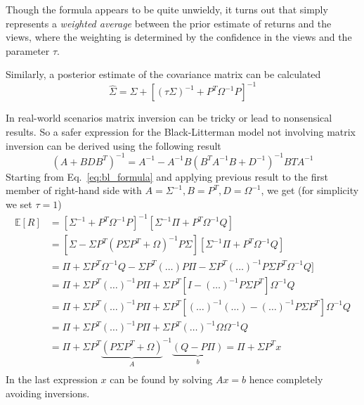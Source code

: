 Though the formula appears to be quite unwieldy, it turns out that simply represents a \emph{weighted average} between the prior estimate of returns and the views, where the weighting is determined by the confidence in the views and the parameter $\tau$.

Similarly, a posterior estimate of the covariance matrix can be calculated
\begin{equation}
\hat{\Sigma} = \Sigma +[(\tau \Sigma)^{-1} + P^T \Omega^{-1}P]^{-1}
\end{equation}

\begin{attention}
In real-world scenarios matrix inversion can be tricky or lead to nonsensical results. So a safer expression for the Black-Litterman model not involving matrix inversion can be derived using the following result
\begin{equation*}
(A+BDB^T)^{-1} = A^{-1} - A^{-1}B(B^TA^{-1}B+D^{-1})^{-1}BTA^{-1}
\end{equation*}
Starting from Eq.~\ref{eq:bl_formula} and applying previous result to the first member of right-hand side with $A=\Sigma^{-1}, B=P^T, D=\Omega^{-1}$,
we get (for simplicity we set $\tau=1$)
\begin{equation}
\begin{aligned}
\mathbb{E}[R] &= [\Sigma^{-1}+P^T\Omega^{-1}P]^{-1}[\Sigma^{-1}\Pi + P^T\Omega^{-1}Q] \\
 &= [\Sigma - \Sigma P^T(P\Sigma P^T + \Omega)^{-1} P\Sigma][\Sigma^{-1}\Pi + P^T\Omega^{-1}Q] \\
 &= \Pi + \Sigma P^T\Omega^{-1}Q - \Sigma P^T(\ldots)P\Pi - \Sigma P^T(\ldots)^{-1} P\Sigma P^T\Omega^{-1}Q] \\
 &= \Pi + \Sigma P^T(\ldots)^{-1} P\Pi + \Sigma P^T[I - (\ldots)^{-1}P\Sigma P^T]\Omega^{-1}Q \\
 &= \Pi + \Sigma P^T(\ldots)^{-1} P\Pi + \Sigma P^T[(\ldots)^{-1} (\ldots) - (\ldots)^{-1}P\Sigma P^T]\Omega^{-1}Q \\
 &= \Pi + \Sigma P^T(\ldots)^{-1} P\Pi + \Sigma P^T(\ldots)^{-1} \Omega\Omega^{-1}Q \\
 &= \Pi + \Sigma P^T{\underbrace{(P\Sigma P^T + \Omega)}_{A}}^{-1} \underbrace{(Q- P\Pi)}_{b} = \Pi + \Sigma P^T x \\
\end{aligned}
\end{equation}
In the last expression $x$ can be found by solving $Ax=b$ hence completely avoiding inversions.
\end{attention}

